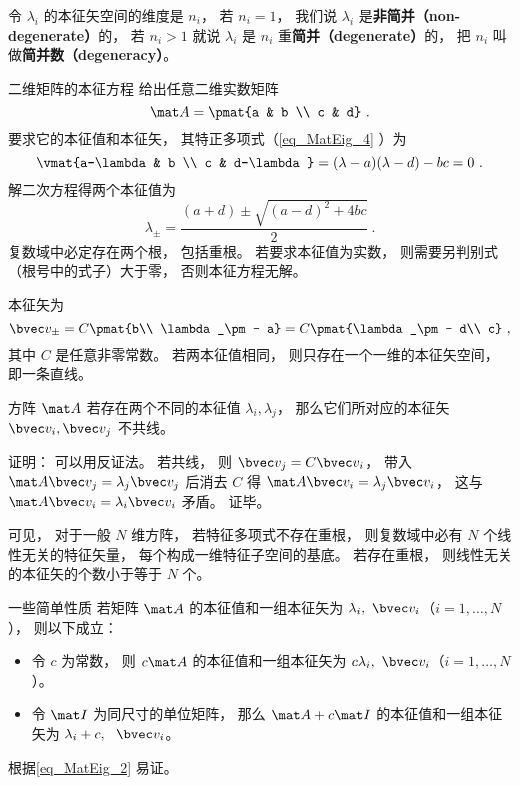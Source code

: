 
令 $\lambda_i$ 的本征矢空间的维度是 $n_i$， 若 $n_i = 1$， 我们说 $\lambda_i$ 是\textbf{非简并（non-degenerate）}的， 若 $n_i > 1$ 就说 $\lambda_i$ 是 $n_i$ 重\textbf{简并（degenerate）}的， 把 $n_i$ 叫做\textbf{简并数（degeneracy）}。

\begin{example}{二维矩阵的本征方程}
给出任意二维实数矩阵
\begin{equation}
\mat A = \pmat{a & b \\ c & d}~.
\end{equation}
要求它的本征值和本征矢， 其特正多项式（\autoref{eq_MatEig_4} ）为
\begin{equation}
\vmat{a-\lambda & b \\ c & d-\lambda} = (\lambda-a)(\lambda-d) - bc = 0~.
\end{equation}
解二次方程得两个本征值为
\begin{equation}
\lambda_\pm = \frac{(a + d) \pm \sqrt{(a-d)^2 + 4bc}}{2}~.
\end{equation}
复数域中必定存在两个根， 包括重根。 若要求本征值为实数， 则需要另判别式（根号中的式子）大于零， 否则本征方程无解。

本征矢为
\begin{equation}
\bvec v_\pm = C\pmat{b\\ \lambda_\pm - a} = C\pmat{\lambda_\pm - d\\ c}~,
\end{equation}
其中 $C$ 是任意非零常数。 若两本征值相同， 则只存在一个一维的本征矢空间， 即一条直线。
\end{example}

\begin{theorem}{}
方阵 $\mat A$ 若存在两个不同的本征值 $\lambda_i, \lambda_j$， 那么它们所对应的本征矢 $\bvec v_i, \bvec v_j$ 不共线。
\end{theorem}
证明： 可以用反证法。 若共线， 则 $\bvec v_j = C \bvec v_i$， 带入 $\mat A \bvec v_j = \lambda_j \bvec v_j$ 后消去 $C$ 得 $\mat A \bvec v_i = \lambda_j \bvec v_i$， 这与 $\mat A \bvec v_i = \lambda_i \bvec v_i$ 矛盾。 证毕。

可见， 对于一般 $N$ 维方阵， 若特征多项式不存在重根， 则复数域中必有 $N$ 个线性无关的特征矢量， 每个构成一维特征子空间的基底。 若存在重根， 则线性无关的本征矢的个数小于等于 $N$ 个。

\begin{theorem}{一些简单性质}
若矩阵 $\mat A$ 的本征值和一组本征矢为 $\lambda_i,\ \bvec v_i$（$i=1,\dots,N$）， 则以下成立：
\begin{itemize}
\item 令 $c$ 为常数， 则 $c\mat A$ 的本征值和一组本征矢为 $c\lambda_i,\ \bvec v_i$（$i=1,\dots,N$）。
\item 令 $\mat I$ 为同尺寸的单位矩阵， 那么 $\mat A + c\mat I$ 的本征值和一组本征矢为 $\lambda_i + c,\ \ \bvec v_i$。
\end{itemize}
\end{theorem}
根据\autoref{eq_MatEig_2} 易证。

